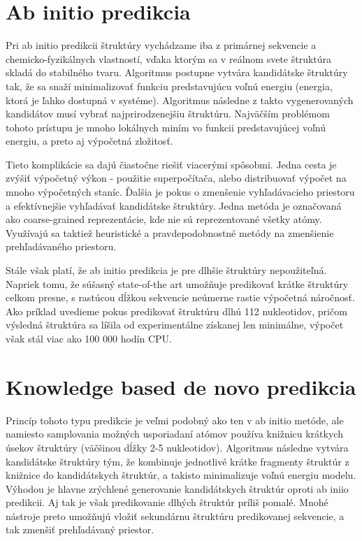 \section{Ab initio predikcia}
Pri ab initio predikcii štruktúry vychádzame iba z primárnej sekvencie a chemicko-fyzikálnych vlastností, vďaka ktorým sa v reálnom svete štruktúra skladá do stabilného tvaru. Algoritmus postupne vytvára kandidátske štruktúry tak, že sa snaží minimalizovať funkciu predstavujúcu voľnú energiu (energia, ktorá je ľahko dostupná v systéme). Algoritmus následne z takto vygenerovaných kandidátov musí vybrať najprirodzenejšiu štruktúru. Najväčším problémom tohoto prístupu je mnoho lokálnych miním vo funkcii predstavujúcej voľnú energiu, a preto aj výpočetná zložitosť.


\indent  Tieto komplikácie sa dajú čiastočne riešiť viacerými spôsobmi. Jedna cesta je zvýšiť výpočetný výkon - použitie superpočítača, alebo distribuovať výpočet na mnoho výpočetných staníc. Ďalšia je pokus o zmenšenie vyhľadávacieho priestoru a efektívnejšie vyhľadávať kandidátske štruktúry. Jedna metóda je označovaná ako coarse-grained reprezentácie, kde nie sú reprezentované všetky atómy. Využívajú sa taktiež heuristické a pravdepodobnostné metódy na zmenšienie prehľadávaného priestoru.


\indent  Stále však platí, že ab initio predikcia je pre dlhšie štruktúry nepoužiteľná. Napriek tomu, že súšasný state-of-the art umožňuje predikovať krátke štruktúry celkom presne, s rastúcou dĺžkou sekvencie neúmerne rastie výpočetná náročnosť. Ako príklad uvedieme pokus predikovať štruktúru dlhú 112 nukleotidov, pričom výsledná štruktúra sa líšila od experimentálne získanej len minimálne, výpočet však stál viac ako 100 000 hodín CPU.  \cite{Qian2007}


\section{Knowledge based de novo predikcia}
Princíp tohoto typu predikcie je veľmi podobný ako ten v ab initio metóde, ale namiesto samplovania možných usporiadaní atómov používa knižnicu krátkych úsekov štruktúry (väčšinou dĺžky 2-5 nukleotidov). Algoritmus následne vytvára kandidátske štruktúry tým, že kombinuje jednotlivé krátke fragmenty štruktúr z knižnice do kandidátskych štruktúr, a takisto minimalizuje voľnú energiu modelu. Výhodou je hlavne zrýchlené generovanie kandidátskych štruktúr oproti ab iniio predikcii. Aj tak je však predikovanie dlhých štruktúr príliš pomalé. Mnohé nástroje preto umožňujú vložiť sekundárnu štruktúru predikovanej sekvencie, a tak zmenšiť prehľadávaný priestor. 

